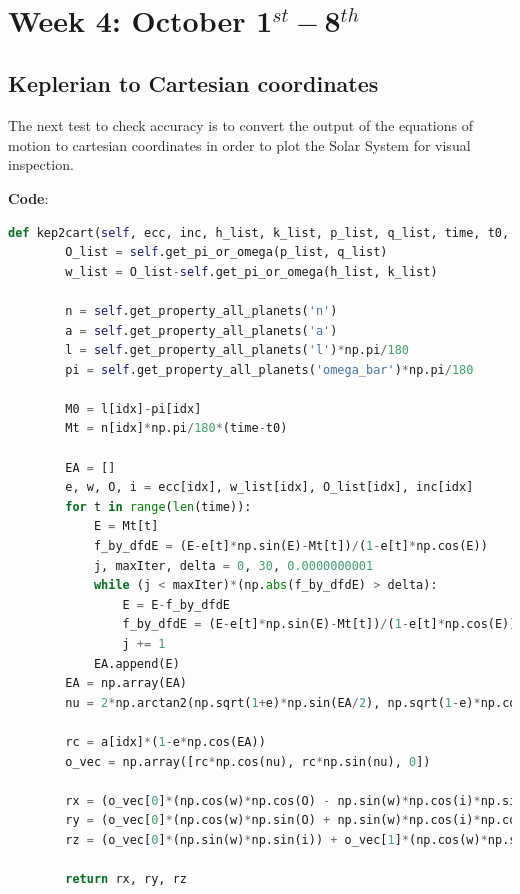 \documentclass[11pt, oneside]{article}   	%
\begin{document}
\newpage
\
\newpage

\section{Week 4: October 1$^{st} - $8$^{th}$}

\subsection{Keplerian to Cartesian coordinates}

The next test to check accuracy is to convert the output of the equations of motion to cartesian coordinates in order to plot the Solar System for visual inspection.

\textbf{Code}:
\begin{lstlisting}[language=Python, caption={Converting from Keplerian to Cartesian coordinates}]
    def kep2cart(self, ecc, inc, h_list, k_list, p_list, q_list, time, t0, idx):
        O_list = self.get_pi_or_omega(p_list, q_list)
        w_list = O_list-self.get_pi_or_omega(h_list, k_list)

        n = self.get_property_all_planets('n')
        a = self.get_property_all_planets('a')
        l = self.get_property_all_planets('l')*np.pi/180
        pi = self.get_property_all_planets('omega_bar')*np.pi/180

        M0 = l[idx]-pi[idx]
        Mt = n[idx]*np.pi/180*(time-t0)

        EA = []
        e, w, O, i = ecc[idx], w_list[idx], O_list[idx], inc[idx]
        for t in range(len(time)):
            E = Mt[t]
            f_by_dfdE = (E-e[t]*np.sin(E)-Mt[t])/(1-e[t]*np.cos(E))
            j, maxIter, delta = 0, 30, 0.0000000001
            while (j < maxIter)*(np.abs(f_by_dfdE) > delta):
                E = E-f_by_dfdE
                f_by_dfdE = (E-e[t]*np.sin(E)-Mt[t])/(1-e[t]*np.cos(E))
                j += 1
            EA.append(E)
        EA = np.array(EA)
        nu = 2*np.arctan2(np.sqrt(1+e)*np.sin(EA/2), np.sqrt(1-e)*np.cos(EA/2))

        rc = a[idx]*(1-e*np.cos(EA))
        o_vec = np.array([rc*np.cos(nu), rc*np.sin(nu), 0])

        rx = (o_vec[0]*(np.cos(w)*np.cos(O) - np.sin(w)*np.cos(i)*np.sin(O)) - o_vec[1]*(np.sin(w)*np.cos(O) + np.cos(w)*np.cos(i)*np.sin(O)))
        ry = (o_vec[0]*(np.cos(w)*np.sin(O) + np.sin(w)*np.cos(i)*np.cos(O)) + o_vec[1]*(np.cos(w)*np.cos(i)*np.cos(O) - np.sin(w)*np.sin(O)))
        rz = (o_vec[0]*(np.sin(w)*np.sin(i)) + o_vec[1]*(np.cos(w)*np.sin(i)))

        return rx, ry, rz
\end{lstlisting}
\end{document}
